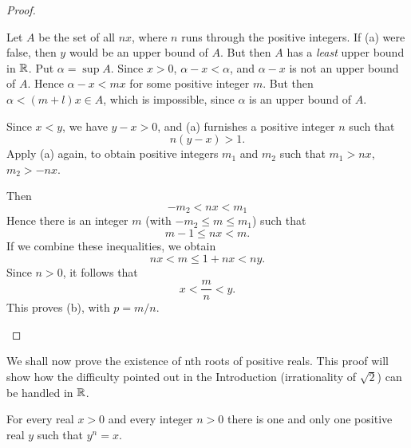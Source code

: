 \begin{proof}
    \begin{asparaenum}[(a)]
        \item Let $A$ be the set of all $nx$,
        where $n$ runs through the positive integers.
        If (a) were false, then $y$ would be an upper bound of $A$.
        But then $A$ has a \emph{least} upper bound in ${\protect\mathbb R}$.
        Put $\alpha = \sup A$.
        Since $x > 0$, $\alpha - x < \alpha$,
        and $\alpha - x$ is not an upper bound of $A$.
        Hence $\alpha - x < mx$ for some positive integer $m$.
        But then $\alpha < (m + l)x \in A$,
        which is impossible,
        since $\alpha$ is an upper bound of $A$.
        \item Since $x < y$, we have $y - x > $0,
        and (a) furnishes a positive integer $n$
        such that
        \begin{equation*}
            n(y - x) > 1.
        \end{equation*}
        Apply (a) again, to obtain positive integers $m_1$ and $m_2$
        such that $m_1 > nx$, $m_2 > -nx$.

        Then
        \begin{equation*}
            -m_2 < nx < m_1
        \end{equation*}
        Hence there is an integer $m$ (with $-m_2 \leq m \leq m_1$)
        such that
        \begin{equation*}
            m - 1\leq n x < m.
        \end{equation*}
        If we combine these inequalities, we obtain
        \begin{equation*}
            nx < m \leq 1 + nx < ny.
        \end{equation*}
        Since $n > 0$, it follows that
        \begin{equation*}
            x < \frac{m}{n} < y.
        \end{equation*}
        This proves (b), with $p = m/n$.
    \end{asparaenum}
\end{proof}

We shall now prove the existence of nth roots of positive reals.
This proof will show how the difficulty pointed out in the Introduction
(irrationality of $\sqrt{2}$) can be handled in ${\protect\mathbb R}$.

\begin{thm}
    \label{thm:1.21}
    For every real $x > 0$ and every integer $n> 0$
    there is one and only one positive real $y$
    such that $y^n = x$.
\end{thm}

